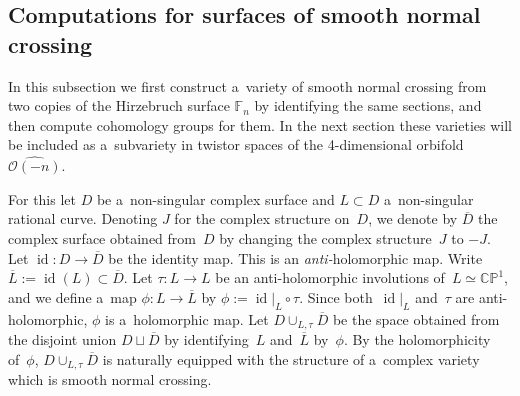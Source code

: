\documentclass[11pt]{article}
\numberwithin{equation}{section}
\DeclareMathOperator{\id}{id}
\begin{document}
\subsection{Computations for surfaces of smooth normal crossing}
\label{ss:sncs}

In this subsection we f\/irst construct a~variety of smooth normal crossing from two copies of the Hirzebruch surface
$\mathbb{F}_n$ by identifying the same sections, and then compute cohomology groups for them.
In the next section these varieties will be included as a~subvariety in twistor spaces of the 4-dimensional orbifold
$\widehat{\mathscr O(-n)}$.

For this let $D$ be a~non-singular complex surface and $L\subset D$ a~non-singular rational curve.
Denoting $J$ for the complex structure on~$D$, we denote by $\overline D$ the complex surface obtained from~$D$ by
changing the complex structure~$J$ to $-J$.
Let $\id :D\to \overline D$ be the identity map.
This is an {\em anti-}holomorphic map.
Write $\overline L:=\id(L)\subset \overline D$.
Let $\tau:L\to L$ be an anti-holomorphic involutions of~$L\simeq\mathbb{CP}^1$, and we def\/ine a~map
$\phi:L\to\overline L$ by $\phi:=\id|_{L}\circ\tau$.
Since both~$\id|_{L}$ and~$\tau$ are anti-holomorphic, $\phi$ is a~holomorphic map.
Let $D\cup_{L,\tau}\overline D$ be the space obtained from the disjoint union $D\sqcup \overline D$ by identifying~$L$
and~$\overline L$ by~$\phi$.
By the holomorphicity of~$\phi$, $D\cup_{L,\tau}\overline D$ is naturally equipped with the structure of a~complex
variety which is smooth normal crossing.
\end{document}

